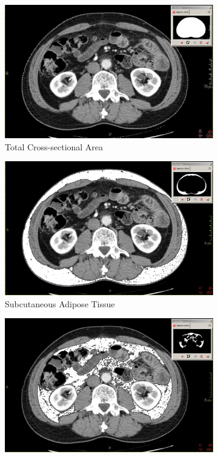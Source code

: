 \begin{figure}[htbp]
	\centering
	\begin{subfigure}{0.45\textwidth}
		\centering
		\includegraphics[width=\textwidth]{Figures/bc_ct_csa}
		\caption{Total Cross-sectional Area}
		\label{fig:bc_ct_csa}
	\end{subfigure}
	\begin{subfigure}{0.45\textwidth}
		\centering
		\includegraphics[width=\textwidth]{Figures/bc_ct_sat}
		\caption{Subcutaneous Adipose Tissue}
		\label{fig:bc_ct_sat}
	\end{subfigure}
	\hfill
	\begin{subfigure}{0.45\textwidth}
		\centering
		\includegraphics[width=\textwidth]{Figures/bc_ct_vat}

\end{subfigure}
\end{figure}
